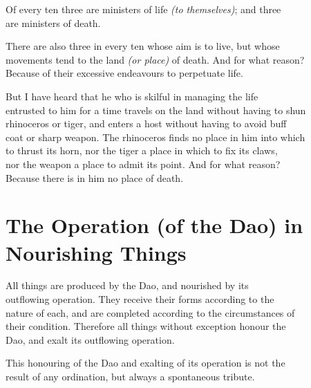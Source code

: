     Of every ten three are ministers of life \textit{(to themselves)}; and three\\
    are ministers of death.\vspace{\baselineskip}
    
    There are also three in every ten whose aim is to live, but whose\\
    movements tend to the land \textit{(or place)} of death. And for what reason?\\
    Because of their excessive endeavours to perpetuate life.\vspace{\baselineskip}
    
    But I have heard that he who is skilful in managing the life\\
    entrusted to him for a time travels on the land without having to shun\\
    rhinoceros or tiger, and enters a host without having to avoid buff\\
    coat or sharp weapon. The rhinoceros finds no place in him into which\\
    to thrust its horn, nor the tiger a place in which to fix its claws,\\
    nor the weapon a place to admit its point. And for what reason?\\
    Because there is in him no place of death.\vspace{\baselineskip}
    
\section*{The Operation (of the Dao) in Nourishing Things}
    All things are produced by the Dao, and nourished by its\\
    outflowing operation. They receive their forms according to the\\
    nature of each, and are completed according to the circumstances of\\
    their condition. Therefore all things without exception honour the\\
    Dao, and exalt its outflowing operation.\vspace{\baselineskip}
    
    This honouring of the Dao and exalting of its operation is not the\\
    result of any ordination, but always a spontaneous tribute.\vspace{\baselineskip}
    
